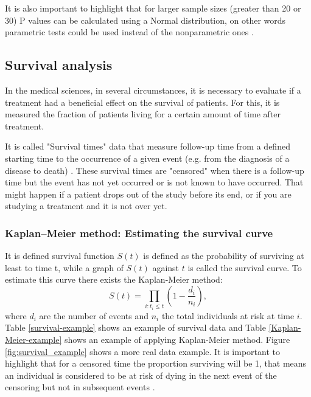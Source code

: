 It is also important to highlight that for larger sample sizes (greater than 20 or 30)
P values can be calculated using a Normal distribution,
on other words parametric tests could be used instead of the nonparametric ones \cite{vickers2005parametric}.



\subsection{Survival analysis}

In the medical sciences, in several circumstances, it is necessary to evaluate if
a treatment had a beneficial effect on the survival of patients.
For this, it is measured the fraction of patients living for a certain amount of time after treatment.

It is called "Survival times" data that measure follow-up time from a
defined starting time to the occurrence of a given event
(e.g. from the diagnosis of a disease to death) \cite{bewick2004statistics}.
These survival times are "censored" when there is a follow-up time
but the event has not yet occurred or is not known to have occurred.
That might happen if a patient drops out of the study before its end,
or if you are studying a treatment and it is not over yet.

\subsubsection{Kaplan–Meier method: Estimating the survival curve}

It is defined  survival function $S(t)$ is defined as the
probability of surviving at least to time t, while a
 graph of $S(t)$ against $t$ is called the survival curve.
To estimate this curve there exists the Kaplan-Meier method:
$$ S(t) = \prod_{i: t_i\leq t}\left(1 - \frac{d_i}{n_i}\right),$$
 where $d_{i}$ are the number of events and  $n_{i}$
the total individuals at risk at time $i$. Table \ref{survival-example} shows
an example of survival data and Table \ref{Kaplan-Meier-example} shows
an example of applying Kaplan-Meier method. Figure \ref{fig:survival_example}
shows a more real data example.
 It is important to highlight that
for a censored time the proportion surviving will be 1, that means
an individual is considered to be at risk of dying in the next event of the censoring
but not in subsequent events \cite{bland2004logrank}.

